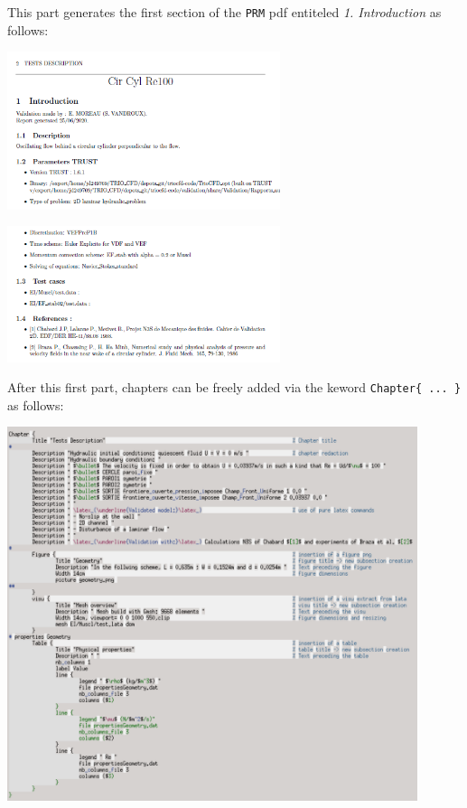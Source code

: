 This part generates the first section of the \texttt{PRM} pdf entiteled \textit{1. Introduction} as follows:\newline
\setlength{\columnseprule}{0.5pt}
\begin{multicols}{2}
\begin{flushleft}\includegraphics[width=8cm]{tools/parameters_PRM_1_pdf.png}\end{flushleft}
\columnbreak
\vspace{0.5cm}\begin{flushright}\includegraphics[width=8cm]{tools/parameters_PRM_2_pdf.png}\end{flushright}
\end{multicols}
\begin{center}\end{center}

After this first part, chapters can be freely added via the keword \verb"Chapter{ ... }" as follows:\newline
\begin{center}\includegraphics[width=12cm]{tools/chapter_PRM_1.png}\end{center}
\begin{center}\end{center}

